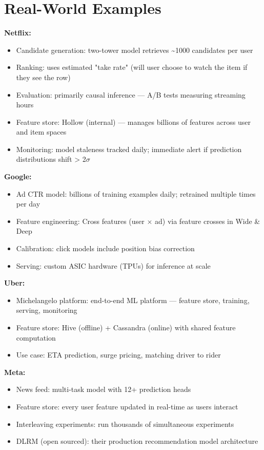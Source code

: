 \documentclass[11pt]{article}
\providecommand{\tightlist}{\setlength{\itemsep}{1pt}\setlength{\parskip}{0pt}}
\begin{document}
\section{Real-World Examples}\label{real-world-examples}

\textbf{Netflix:}

\begin{itemize}
\tightlist
\item
  Candidate generation: two-tower model retrieves \textasciitilde1000 candidates per user
\item
  Ranking: uses estimated "take rate" (will user choose to watch the item if they see the row)
\item
  Evaluation: primarily causal inference --- A/B tests measuring streaming hours
\item
  Feature store: Hollow (internal) --- manages billions of features across user and item spaces
\item
  Monitoring: model staleness tracked daily; immediate alert if prediction distributions shift \textgreater{} 2\(\sigma\)
\end{itemize}

\textbf{Google:}

\begin{itemize}
\tightlist
\item
  Ad CTR model: billions of training examples daily; retrained multiple times per day
\item
  Feature engineering: Cross features (user \(\times\) ad) via feature crosses in Wide \& Deep
\item
  Calibration: click models include position bias correction
\item
  Serving: custom ASIC hardware (TPUs) for inference at scale
\end{itemize}

\textbf{Uber:}

\begin{itemize}
\tightlist
\item
  Michelangelo platform: end-to-end ML platform --- feature store, training, serving, monitoring
\item
  Feature store: Hive (offline) + Cassandra (online) with shared feature computation
\item
  Use case: ETA prediction, surge pricing, matching driver to rider
\end{itemize}

\textbf{Meta:}

\begin{itemize}
\tightlist
\item
  News feed: multi-task model with 12+ prediction heads
\item
  Feature store: every user feature updated in real-time as users interact
\item
  Interleaving experiments: run thousands of simultaneous experiments
\item
  DLRM (open sourced): their production recommendation model architecture
\end{itemize}
\end{document}
